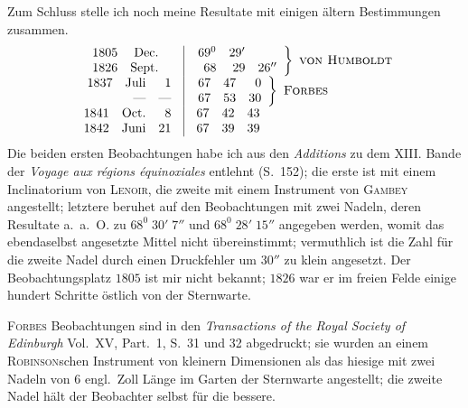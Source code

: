 Zum Schluss stelle ich noch meine Resultate mit einigen ältern Bestimmungen zusammen.
\[
\begin{array}{r|l}
\begin{array}{rrr}1805&\text{Dec.}&\\1826&\text{Sept.}&\end{array}&
\left.\begin{array}{rrr}69^0&29'&\\68&29&26''\end{array}\right\}\ \text{\textsc{von Humboldt}}\\
\begin{array}{rrr}1837&\text{Juli}&1\\&\text{—}&\text{—}\end{array}&
\left.\begin{array}{rrr}67&47&0\\67&53&30\end{array}\right\}\ \text{\textsc{Forbes}}\\
\begin{array}{rrr}1841&\text{Oct.}&8\\1842&\text{Juni}&21\end{array}&
\begin{array}{rrr}67&42&43\\67&39&39\end{array}
\end{array}
\]
Die beiden ersten Beobachtungen habe ich aus den \textit{Additions} zu dem XIII. Bande der \textit{Voyage aux régions équinoxiales} entlehnt (S.\ 152); die erste ist mit einem Inclinatorium von \textsc{Lenoir}, die zweite mit einem Instrument von \textsc{Gambey} angestellt; letztere beruhet auf den Beobachtungen mit zwei Nadeln, deren Resultate a.\ a.\ O. zu $68^0\;30'\;7''$ und $68^0\;28'\;15''$ angegeben werden, womit das ebendaselbst angesetzte Mittel nicht übereinstimmt; vermuthlich ist die Zahl für die zweite Nadel durch einen Druckfehler um $30''$ zu klein angesetzt. Der Beobachtungsplatz $1805$ ist mir nicht bekannt; $1826$ war er im freien Felde einige hundert Schritte östlich von der Sternwarte.

\textsc{Forbes} Beobachtungen sind in den \textit{Transactions of the Royal Society of Edinburgh} Vol.\ XV, Part.\ 1, S.\ 31 und 32 abgedruckt; sie wurden an einem \textsc{Robinson}schen Instrument von kleinern Dimensionen als das hiesige mit zwei Nadeln von $6$ engl.\ Zoll Länge im Garten der Sternwarte angestellt; die zweite Nadel hält der Beobachter selbst für die bessere.

